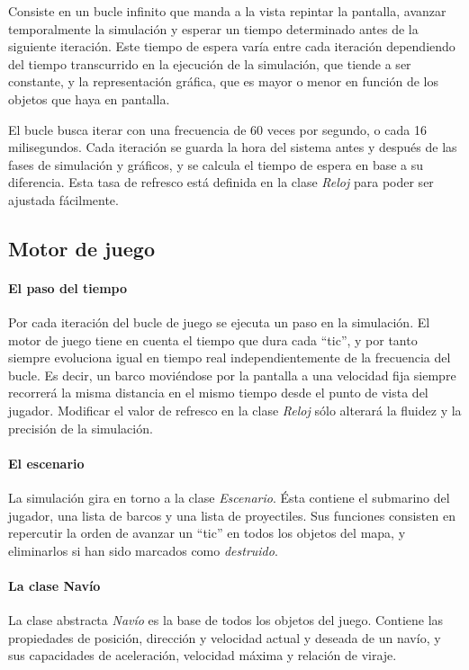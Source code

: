 \documentclass[a4paper,
	11pt,
	parskip=full,
	bibliography=totoc,
	twoside
	]{scrartcl}
\begin{document}
		Consiste en un bucle infinito que manda a la vista repintar la pantalla, avanzar temporalmente la simulación y esperar un tiempo determinado antes de la siguiente iteración. Este tiempo de espera varía entre cada iteración dependiendo del tiempo transcurrido en la ejecución de la simulación, que tiende a ser constante, y la representación gráfica, que es mayor o menor en función de los objetos que haya en pantalla.
		
		El bucle busca iterar con una frecuencia de 60 veces por segundo, o cada 16 milisegundos. Cada iteración se guarda la hora del sistema antes y después de las fases de simulación y gráficos, y se calcula el tiempo de espera en base a su diferencia. Esta tasa de refresco está definida en la clase \textit{Reloj} para poder ser ajustada fácilmente.
	
	\subsection{Motor de juego}
	\label{subsec:motor_juego}
		\paragraph{El paso del tiempo}
			Por cada iteración del bucle de juego se ejecuta un paso en la simulación. El motor de juego tiene en cuenta el tiempo que dura cada ``tic'', y por tanto siempre evoluciona igual en tiempo real independientemente de la frecuencia del bucle. Es decir, un barco moviéndose por la pantalla a una velocidad fija siempre recorrerá la misma distancia en el mismo tiempo desde el punto de vista del jugador. Modificar el valor de refresco en la clase \textit{Reloj} sólo alterará la fluidez y la precisión de la simulación.
			
		\paragraph{El escenario}
			La simulación gira en torno a la clase \textit{Escenario}. Ésta contiene el submarino del jugador, una lista de barcos y una lista de proyectiles. Sus funciones consisten en repercutir la orden de avanzar un ``tic'' en todos los objetos del mapa, y eliminarlos si han sido marcados como \textit{destruido}.
		
		\paragraph{La clase Navío}
			La clase abstracta \textit{Navío} es la base de todos los objetos del juego. Contiene las propiedades de posición, dirección y velocidad actual y deseada de un navío, y sus capacidades de aceleración, velocidad máxima y relación de viraje.
			
\end{document}
